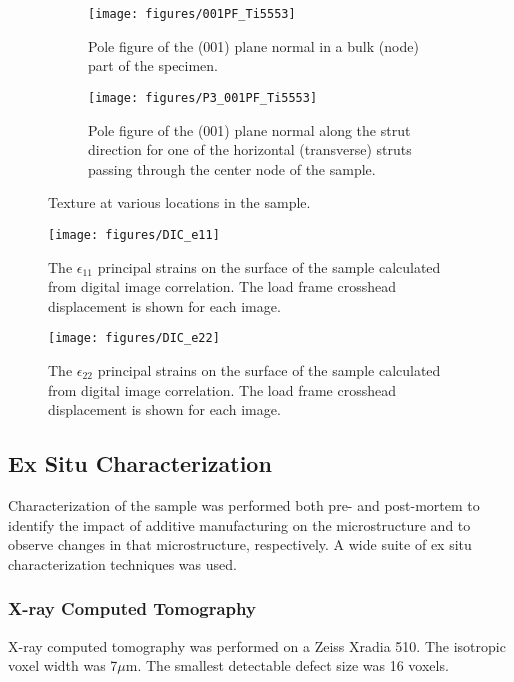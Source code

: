 \begin{figure}[b]
	\begin{subfigure}{1\linewidth}
		\texttt{[image: figures/001PF\_Ti5553]}
		\caption{Pole figure of the (001) plane normal in a bulk (node) part of the specimen.}
		\label{P3}
	\end{subfigure}
	\begin{subfigure}{1\linewidth}
		\texttt{[image: figures/P3\_001PF\_Ti5553]}
		\caption{Pole figure of the (001) plane normal along the strut direction for one of the horizontal (transverse) struts passing through the center node of the sample.}
		\label{strut}
	\end{subfigure}
	\caption{Texture at various locations in the sample.}
	\label{texture}
\end{figure}



\begin{figure*}
	\texttt{[image: figures/DIC\_e11]}
	\caption{The $\epsilon_{11}$ principal strains on the surface of the sample calculated from digital image correlation. The load frame crosshead displacement is shown for each image.}
	\label{e11}
\end{figure*}
\begin{figure*}
	\texttt{[image: figures/DIC\_e22]}
	\caption{The $\epsilon_{22}$ principal strains on the surface of the sample calculated from digital image correlation. The load frame crosshead displacement is shown for each image.}
	\label{e22}
\end{figure*}

\subsection{Ex Situ Characterization}
Characterization of the sample was performed both pre- and post-mortem to identify the impact of additive manufacturing on the microstructure and to observe changes in that microstructure, respectively. A wide suite of ex situ characterization techniques was used.


\subsubsection{X-ray Computed Tomography}


X-ray computed tomography was performed on a Zeiss Xradia 510. The isotropic voxel width was 7$\mu$m. The smallest detectable defect size was 16 voxels.

